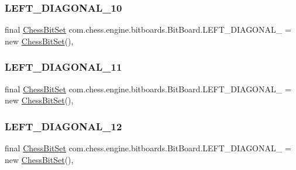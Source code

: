 \subsubsection{\texorpdfstring{LEFT\_DIAGONAL\_10}{LEFT\_DIAGONAL\_10}}
{\footnotesize\ttfamily final \mbox{\hyperlink{classcom_1_1chess_1_1engine_1_1bitboards_1_1_chess_bit_set}{Chess\+Bit\+Set}} com.\+chess.\+engine.\+bitboards.\+Bit\+Board.\+L\+E\+F\+T\+\_\+\+D\+I\+A\+G\+O\+N\+A\+L\+\_ = new \mbox{\hyperlink{classcom_1_1chess_1_1engine_1_1bitboards_1_1_chess_bit_set}{Chess\+Bit\+Set}}()\hspace{0.3cm}{\ttfamily [static]}, {\ttfamily [package]}}

\mbox{\label{classcom_1_1chess_1_1engine_1_1bitboards_1_1_bit_board_a857b5864f7e9df04b82ef3f5bbc4a3e8}} 
\subsubsection{\texorpdfstring{LEFT\_DIAGONAL\_11}{LEFT\_DIAGONAL\_11}}
{\footnotesize\ttfamily final \mbox{\hyperlink{classcom_1_1chess_1_1engine_1_1bitboards_1_1_chess_bit_set}{Chess\+Bit\+Set}} com.\+chess.\+engine.\+bitboards.\+Bit\+Board.\+L\+E\+F\+T\+\_\+\+D\+I\+A\+G\+O\+N\+A\+L\+\_ = new \mbox{\hyperlink{classcom_1_1chess_1_1engine_1_1bitboards_1_1_chess_bit_set}{Chess\+Bit\+Set}}()\hspace{0.3cm}{\ttfamily [static]}, {\ttfamily [package]}}

\mbox{\label{classcom_1_1chess_1_1engine_1_1bitboards_1_1_bit_board_ab30f141ba1a206889f14988652985828}} 
\subsubsection{\texorpdfstring{LEFT\_DIAGONAL\_12}{LEFT\_DIAGONAL\_12}}
{\footnotesize\ttfamily final \mbox{\hyperlink{classcom_1_1chess_1_1engine_1_1bitboards_1_1_chess_bit_set}{Chess\+Bit\+Set}} com.\+chess.\+engine.\+bitboards.\+Bit\+Board.\+L\+E\+F\+T\+\_\+\+D\+I\+A\+G\+O\+N\+A\+L\+\_ = new \mbox{\hyperlink{classcom_1_1chess_1_1engine_1_1bitboards_1_1_chess_bit_set}{Chess\+Bit\+Set}}()\hspace{0.3cm}{\ttfamily [static]}, {\ttfamily [package]}}

